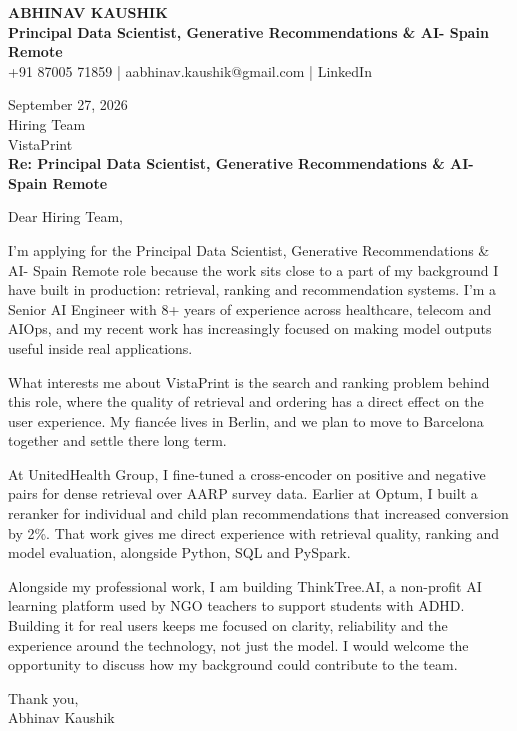\documentclass[10pt,a4paper]{article}
\begin{document}
\begin{center}
{\Large\bfseries ABHINAV KAUSHIK}\\[2pt]
{\bfseries Principal Data Scientist, Generative Recommendations \& AI- Spain Remote}\\[2pt]
+91 87005 71859 \quad | \quad aabhinav.kaushik@gmail.com \quad | \quad LinkedIn
\end{center}
\vspace{8pt}
September 27, 2026\\[6pt]
Hiring Team\\
VistaPrint\\[4pt]
\textbf{Re: Principal Data Scientist, Generative Recommendations \& AI- Spain Remote}

Dear Hiring Team,

I’m applying for the Principal Data Scientist, Generative Recommendations \& AI- Spain Remote role because the work sits close to a part of my background I have built in production: retrieval, ranking and recommendation systems. I’m a Senior AI Engineer with 8+ years of experience across healthcare, telecom and AIOps, and my recent work has increasingly focused on making model outputs useful inside real applications.

What interests me about VistaPrint is the search and ranking problem behind this role, where the quality of retrieval and ordering has a direct effect on the user experience. My fiancée lives in Berlin, and we plan to move to Barcelona together and settle there long term.

At UnitedHealth Group, I fine-tuned a cross-encoder on positive and negative pairs for dense retrieval over AARP survey data. Earlier at Optum, I built a reranker for individual and child plan recommendations that increased conversion by 2\%. That work gives me direct experience with retrieval quality, ranking and model evaluation, alongside Python, SQL and PySpark.

Alongside my professional work, I am building ThinkTree.AI, a non-profit AI learning platform used by NGO teachers to support students with ADHD. Building it for real users keeps me focused on clarity, reliability and the experience around the technology, not just the model. I would welcome the opportunity to discuss how my background could contribute to the team.

Thank you,\\
Abhinav Kaushik
\end{document}
